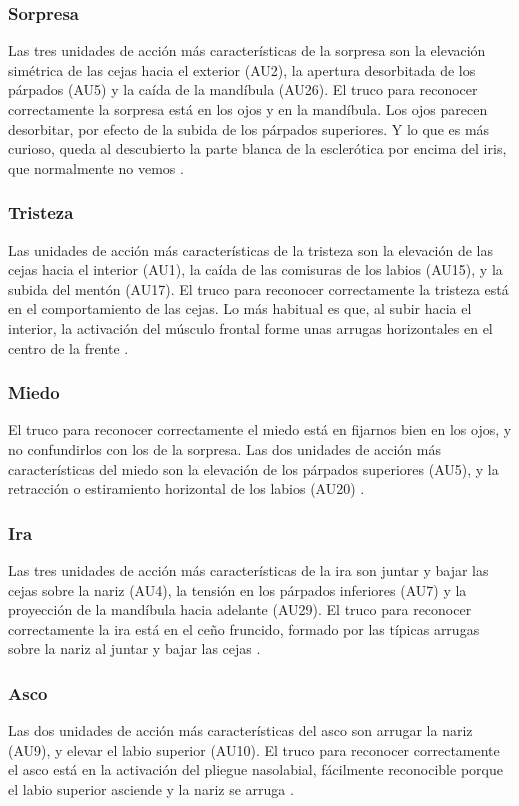 \subsubsection*{Sorpresa}
Las tres unidades de acción más características de la sorpresa son la elevación simétrica de las cejas hacia el exterior (AU2), la apertura desorbitada de los párpados (AU5) y la caída de la mandíbula (AU26). El truco para reconocer correctamente la sorpresa está en los ojos y en la mandíbula. Los ojos parecen desorbitar, por efecto de la subida de los párpados superiores. Y lo que es más curioso, queda al descubierto la parte blanca de la esclerótica por encima del iris, que normalmente no vemos \cite{ReconocerLasEmociones}.

\subsubsection*{Tristeza}
Las unidades de acción más características de la tristeza son la elevación de las cejas hacia el interior (AU1), la caída de las comisuras de los labios (AU15), y la subida del mentón (AU17). El truco para reconocer correctamente la tristeza está en el comportamiento de las cejas. Lo más habitual es que, al subir hacia el interior, la activación del músculo frontal forme unas arrugas horizontales en el centro de la frente \cite{ReconocerLasEmociones}.

\subsubsection*{Miedo}
El truco para reconocer correctamente el miedo está en fijarnos bien en los ojos, y no confundirlos con los de la sorpresa. Las dos unidades de acción más características del miedo son la elevación de los párpados superiores (AU5), y la retracción o estiramiento horizontal de los labios (AU20) \cite{ReconocerLasEmociones}.

\subsubsection*{Ira}
Las tres unidades de acción más características de la ira son juntar y bajar las cejas sobre la nariz (AU4), la tensión en los párpados inferiores (AU7) y la proyección de la mandíbula hacia adelante (AU29). El truco para reconocer correctamente la ira está en el ceño fruncido, formado por las típicas arrugas sobre la nariz al juntar y bajar las cejas \cite{ReconocerLasEmociones}.

\subsubsection*{Asco}
Las dos unidades de acción más características del asco son arrugar la nariz (AU9), y elevar el labio superior (AU10). El truco para reconocer correctamente el asco está en la activación del pliegue nasolabial, fácilmente reconocible porque el labio superior asciende y la nariz se arruga \cite{ReconocerLasEmociones}.

